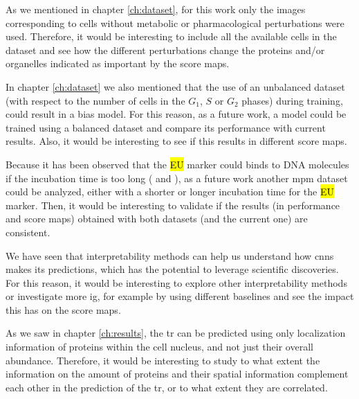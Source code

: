 

As we mentioned in chapter \ref{ch:dataset}, for this work only the images corresponding to cells without metabolic or pharmacological perturbations were used. Therefore, it would be interesting to include all the available cells in the dataset and see how the different perturbations change the proteins and/or organelles indicated as important by the score maps.

In chapter \ref{ch:dataset} we also mentioned that the use of an unbalanced dataset (with respect to the number of cells in the $G_1$, $S$ or $G_2$ phases) during training, could result in a bias model. For this reason, as a future work, a model could be trained using a balanced dataset and compare its performance with current results. Also, it would be interesting to see if this results in different score maps.

Because it has been observed that the \hl{EU} marker could binds to DNA molecules if the incubation time is too long (\cite{jao2008exploring} and \cite{bao2018capturing}), as a future work another \gls{mpm} dataset could be analyzed, either with a shorter or longer incubation time for the \hl{EU} marker. Then, it would be interesting to validate if the results (in performance and score maps) obtained with both datasets (and the current one) are consistent.

We have seen that interpretability methods can help us understand how \glspl{cnn} makes its predictions, which has the potential to leverage scientific discoveries.
For this reason, it would be interesting to explore other interpretability methods or investigate more \gls{ig}, for example by using  different baselines and see the impact this has on the score maps.

As we saw in chapter \ref{ch:results}, the \gls{tr} can be predicted using only localization information of proteins within the cell nucleus, and not just their overall abundance. Therefore, it would be interesting to study to what extent the information on the amount of proteins and their spatial information complement each other in the prediction of the \gls{tr}, or to what extent they are correlated.

